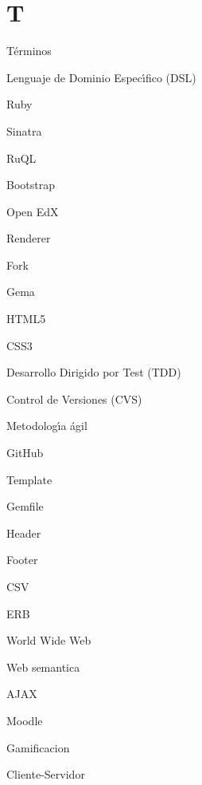 \section{T}
\label{Apendice1:T}

T\'erminos
\bigskip

Lenguaje de Dominio Espec\'{\i}fico (DSL)
\bigskip

Ruby
\bigskip

Sinatra
\bigskip

RuQL
\bigskip

Bootstrap
\bigskip

Open EdX
\bigskip

Renderer
\bigskip

Fork
\bigskip

Gema
\bigskip

HTML5
\bigskip

CSS3
\bigskip

Desarrollo Dirigido por Test (TDD)
\bigskip

Control de Versiones (CVS)
\bigskip

Metodolog\'{\i}a \'agil
\bigskip

GitHub
\bigskip

Template
\bigskip

Gemfile
\bigskip

Header
\bigskip

Footer
\bigskip

CSV
\bigskip

ERB
\bigskip

World Wide Web
\bigskip

Web semantica
\bigskip

AJAX
\bigskip

Moodle
\bigskip

Gamificacion
\bigskip

Cliente-Servidor
\bigskip